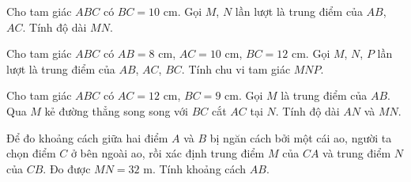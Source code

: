 

\begin{bt}%
	Cho tam giác $ABC$ có $BC=10\text{ cm}$. Gọi $M$, $N$ lần lượt là trung điểm của $AB$, $AC$. Tính độ dài $MN$.
\end{bt}

\begin{bt}%
	Cho tam giác $ABC$ có $AB=8\text{ cm}$, $AC=10\text{ cm}$, $BC=12\text{ cm}$. Gọi $M$, $N$, $P$ lần lượt là trung điểm của $AB$, $AC$, $BC$. Tính chu vi tam giác $MNP$.
\end{bt}

\begin{bt}%
	Cho tam giác $ABC$ có $AC=12\text{ cm}$, $BC=9\text{ cm}$. Gọi $M$ là trung điểm của $AB$. Qua $M$ kẻ đường thẳng song song với $BC$ cắt $AC$ tại $N$. Tính độ dài $AN$ và $MN$.
\end{bt}

\begin{bt}%
	Để đo khoảng cách giữa hai điểm $A$ và $B$ bị ngăn cách bởi một cái ao, người ta chọn điểm $C$ ở bên ngoài ao, rồi xác định trung điểm $M$ của $CA$ và trung điểm $N$ của $CB$. Đo được $MN=32\text{ m}$. Tính khoảng cách $AB$.
\end{bt}

